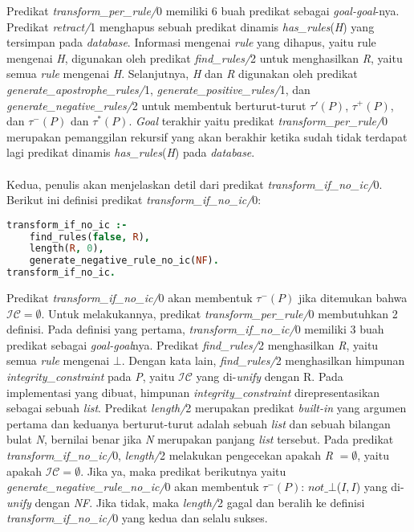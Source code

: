 Predikat \textit{transform\_per\_rule/}0 memiliki 6 buah predikat sebagai \textit{goal-goal}-nya. Predikat \textit{retract/}1 menghapus sebuah predikat dinamis \textit{has\_rules}(\textit{H}) yang tersimpan pada \textit{database}. Informasi mengenai \textit{rule} yang dihapus, yaitu rule mengenai \textit{H}, digunakan oleh predikat \textit{find\_rules/}2 untuk menghasilkan \textit{R}, yaitu semua \textit{rule} mengenai \textit{H}. Selanjutnya, \textit{H} dan \textit{R} digunakan oleh predikat \textit{generate\_apostrophe\_rules/}1, \textit{generate\_positive\_rules/}1, dan \textit{generate\_negative\_rules/}2 untuk membentuk berturut-turut $\tau'(\textit{P})$, $\tau^+(\textit{P})$, dan $\tau^-(\textit{P})$ dan $\tau^*(\textit{P})$. \textit{Goal} terakhir yaitu predikat \textit{transform\_per\_rule/}0 merupakan pemanggilan rekursif yang akan berakhir ketika sudah tidak terdapat lagi predikat dinamis \textit{has\_rules}(\textit{H}) pada \textit{database}.
\\ \\
Kedua, penulis akan menjelaskan detil dari predikat \textit{transform\_if\_no\_ic/}0. Berikut ini definisi predikat \textit{transform\_if\_no\_ic/}0: \\

\begin{lstlisting}[language=Prolog, caption=Definisi predikat \textit{transform\_if\_no\_ic/}0,
tabsize=4,
frame=none,
captionpos=b]
transform_if_no_ic :-
	find_rules(false, R),
	length(R, 0),
	generate_negative_rule_no_ic(NF).
transform_if_no_ic.
\end{lstlisting}

Predikat \textit{transform\_if\_no\_ic/}0 akan membentuk $\tau^-(\textit{P})$ jika ditemukan bahwa $\mathcal{IC} = \emptyset$. Untuk melakukannya, predikat \textit{transform\_per\_rule/}0 membutuhkan 2 definisi. Pada definisi yang pertama, \textit{transform\_if\_no\_ic/}0 memiliki 3 buah predikat sebagai \textit{goal-goal}nya. Predikat \textit{find\_rules/}2 menghasilkan \textit{R}, yaitu semua \textit{rule} mengenai $\bot$. Dengan kata lain, \textit{find\_rules/}2 menghasilkan himpunan \textit{integrity\_constraint} pada \textit{P}, yaitu $\mathcal{IC}$ yang di-\textit{unify} dengan R. Pada implementasi yang dibuat, himpunan \textit{integrity\_constraint} direpresentasikan sebagai sebuah \textit{list}. Predikat \textit{length/}2 merupakan predikat \textit{built-in} yang argumen pertama dan keduanya berturut-turut adalah sebuah \textit{list} dan sebuah bilangan bulat \textit{N}, bernilai benar jika \textit{N} merupakan panjang \textit{list} tersebut. Pada predikat \textit{transform\_if\_no\_ic/}0, \textit{length/}2 melakukan pengecekan apakah \textit{R} $ = \emptyset$, yaitu apakah $\mathcal{IC} = \emptyset$. Jika ya, maka predikat berikutnya yaitu \textit{generate\_negative\_rule\_no\_ic/}0 akan membentuk $\tau^-(\textit{P})$:  $not\_\bot$($I, I$) yang di-\textit{unify} dengan \textit{NF}. Jika tidak, maka \textit{length/}2 gagal dan beralih ke definisi \textit{transform\_if\_no\_ic/}0 yang kedua dan selalu sukses.

